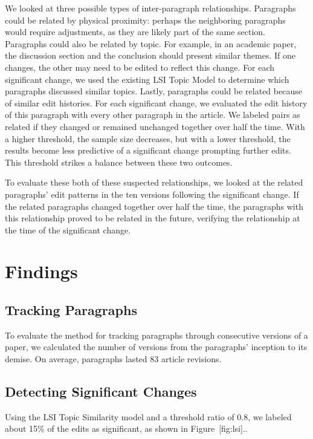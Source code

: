 We looked at three possible types of inter-paragraph relationships.
Paragraphs could be related by physical proximity: perhaps the
neighboring paragraphs would require adjustments, as they are likely
part of the same section. Paragraphs could also be related by topic. For
example, in an academic paper, the discussion section and the conclusion
should present similar themes. If one changes, the other may need to be
edited to reflect this change. For each significant change, we used the
existing LSI Topic Model to determine which paragraphs discussed similar
topics. Lastly, paragraphs could be related because of similar edit
histories. For each significant change, we evaluated the edit history of
this paragraph with every other paragraph in the article. We labeled
pairs as related if they changed or remained unchanged together over
half the time. With a higher threshold, the sample size decreases, but
with a lower threshold, the results become less predictive of a
significant change prompting further edits. This threshold strikes a
balance between these two outcomes.

To evaluate these both of these suspected relationships, we looked at
the related paragraphs' edit patterns in the ten versions following the
significant change. If the related paragraphs changed together over half
the time, the paragraphs with this relationship proved to be related in
the future, verifying the relationship at the time of the significant
change.

\section{Findings}\label{findings}

\subsection{Tracking Paragraphs}\label{tracking-paragraphs-1}

To evaluate the method for tracking paragraphs through consecutive
versions of a paper, we calculated the number of versions from the
paragraphs' inception to its demise. On average, paragraphs lasted 83
article revisions.

\subsection{Detecting Significant
Changes}\label{detecting-significant-changes}

Using the LSI Topic Similarity model and a threshold ratio of 0.8, we
labeled about 15\% of the edits as significant, as shown in
Figure~{[}fig:lsi{]}..

